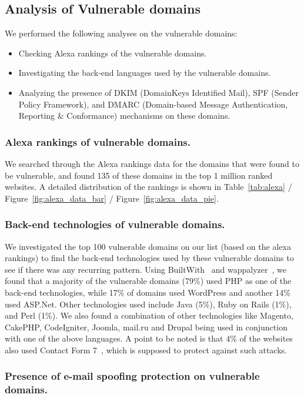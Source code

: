 \subsection{Analysis of Vulnerable domains}

We performed the following analyses on the vulnerable domains:
\begin{itemize}
	\item Checking Alexa rankings of the vulnerable domains.
	\item Investigating the back-end languages used by the vulnerable domains.
	\item Analyzing the presence of DKIM (DomainKeys Identified Mail), SPF (Sender Policy Framework), and DMARC (Domain-based Message Authentication, Reporting \& Conformance) mechanisms on these domains.
\end{itemize}


\subsubsection{Alexa rankings of vulnerable domains.}
We searched through the Alexa rankings data\cite{alexa} for the domains that were found to be vulnerable, and found 135 of these domains in the top 1 million ranked websites. A detailed distribution of the rankings is shown in Table~\ref{tab:alexa} / Figure~\ref{fig:alexa_data_bar} / Figure~\ref{fig:alexa_data_pie}.




\subsubsection{Back-end technologies of vulnerable domains.}
We investigated the top 100 vulnerable domains on our list (based on the alexa rankings) to find the back-end technologies used by these vulnerable domains to see if there was any recurring pattern. Using BuiltWith~\cite{builtwith} and wappalyzer~\cite{wappalyzer}, we found that a majority of the vulnerable domains (79\%) used PHP as one of the back-end technologies, while 17\% of domains used WordPress and another 14\% used ASP.Net. Other technologies used include Java (5\%), Ruby on Rails (1\%), and Perl (1\%). We also found a combination of other technologies like Magento, CakePHP, CodeIgniter, Joomla, mail.ru and Drupal being used in conjunction with one of the above languages. A point to be noted is that 4\% of the websites also used Contact Form 7~\cite{CF7}, which is supposed to protect against such attacks. 

\subsubsection{Presence of e-mail spoofing protection on vulnerable domains.}